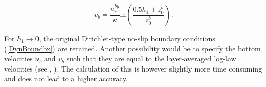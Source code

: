 \begin{equation}\label{vlogdis}
v_b = \frac{u_*^{by}}{\kappa}\mbox{ln} \left(\frac{0.5h_1+z_0^b}{z_0^b}\right).
\end{equation}

For $h_1\rightarrow 0$, the original 
Dirichlet-type
no-slip boundary conditions (\ref{DynBoundbx}) are retained.
Another possibility would be to specify the bottom velocities $u_b$ and $v_b$
such that they are equal to the layer-averaged 
log-law velocities
(see \cite{BAUMERTea89}, \cite{BAUMERTea92}).
The calculation of this is however slightly more time consuming
and does not lead to a higher accuracy.


